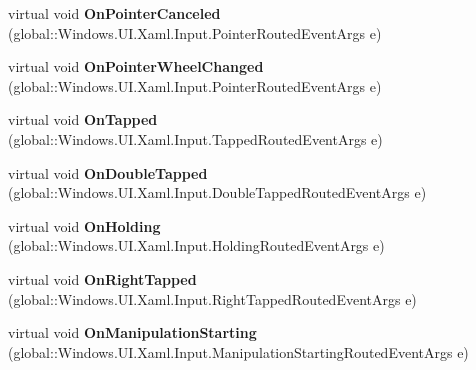 \begin{DoxyCompactItemize}
virtual void {\bfseries On\+Pointer\+Canceled} (global\+::\+Windows.\+U\+I.\+Xaml.\+Input.\+Pointer\+Routed\+Event\+Args e)
\item 
\mbox{\label{class_windows_1_1_u_i_1_1_xaml_1_1_controls_1_1_control_a05f4eb2e6e829dbc04ce27f21650e77d}} 
virtual void {\bfseries On\+Pointer\+Wheel\+Changed} (global\+::\+Windows.\+U\+I.\+Xaml.\+Input.\+Pointer\+Routed\+Event\+Args e)
\item 
\mbox{\label{class_windows_1_1_u_i_1_1_xaml_1_1_controls_1_1_control_a520b4f7b836bf087965e32998fd5898e}} 
virtual void {\bfseries On\+Tapped} (global\+::\+Windows.\+U\+I.\+Xaml.\+Input.\+Tapped\+Routed\+Event\+Args e)
\item 
\mbox{\label{class_windows_1_1_u_i_1_1_xaml_1_1_controls_1_1_control_a3e02cbf66e1030379acbcae595e718b7}} 
virtual void {\bfseries On\+Double\+Tapped} (global\+::\+Windows.\+U\+I.\+Xaml.\+Input.\+Double\+Tapped\+Routed\+Event\+Args e)
\item 
\mbox{\label{class_windows_1_1_u_i_1_1_xaml_1_1_controls_1_1_control_a8cceeae67a7b01f8f18f30b0e6cf83c6}} 
virtual void {\bfseries On\+Holding} (global\+::\+Windows.\+U\+I.\+Xaml.\+Input.\+Holding\+Routed\+Event\+Args e)
\item 
\mbox{\label{class_windows_1_1_u_i_1_1_xaml_1_1_controls_1_1_control_addc7255a46f490ec04cc165962614c99}} 
virtual void {\bfseries On\+Right\+Tapped} (global\+::\+Windows.\+U\+I.\+Xaml.\+Input.\+Right\+Tapped\+Routed\+Event\+Args e)
\item 
\mbox{\label{class_windows_1_1_u_i_1_1_xaml_1_1_controls_1_1_control_a967a18b3578c9d2bd19a72f4a964d3a3}} 
virtual void {\bfseries On\+Manipulation\+Starting} (global\+::\+Windows.\+U\+I.\+Xaml.\+Input.\+Manipulation\+Starting\+Routed\+Event\+Args e)
\item 
\mbox{\label{class_windows_1_1_u_i_1_1_xaml_1_1_controls_1_1_control_a435a48ffc2e72a28d5a8c492fb75ee38}} 

\end{DoxyCompactItemize}
